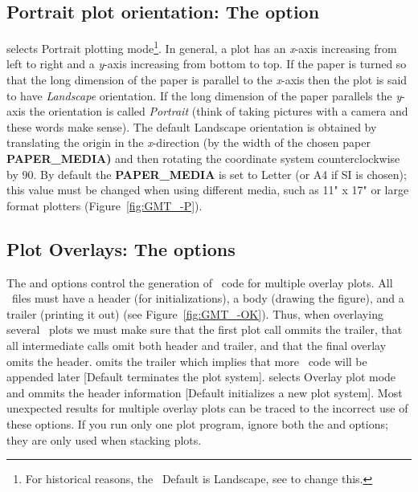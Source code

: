 \subsection{Portrait plot orientation: The  option} 


 selects Portrait plotting mode\footnote{For historical reasons, the \GMT\
Default is Landscape, see  to change this.}.  In general,
a plot has an \emph{x}-axis increasing from left to
right and a \emph{y}-axis increasing from bottom to top.  If the
paper is turned so that the long dimension of the paper is
parallel to the \emph{x}-axis then the plot is said to have
\emph{Landscape} orientation.  If the long dimension of
the paper parallels the \emph{y}-axis the orientation is called
\emph{Portrait} (think of taking pictures with a camera
and these words make sense).  The
default Landscape orientation is obtained by translating the origin in the
\emph{x}-direction (by the width of the chosen paper \textbf{PAPER\_MEDIA)} and then rotating the
coordinate system counterclockwise by 90\DS.  By default the \textbf{PAPER\_MEDIA} is
set to Letter (or A4 if SI is chosen); this value must be changed
when using different media, such as 11" x 17" or large format plotters
(Figure~\ref{fig:GMT_-P}).


\subsection{Plot Overlays: The   options}


The  and  options control the generation of \PS\ code for multiple
overlay plots.  All \PS\ files must have a header (for initializations),
a body (drawing the figure), and a trailer (printing it out) (see
Figure~\ref{fig:GMT_-OK}).  Thus,
when overlaying several \GMT\ plots we must make sure that the first plot
call ommits the trailer, that all intermediate calls omit both header and
trailer, and that the final overlay omits the header.
 omits the trailer which implies that more \PS\ code will be appended
later [Default terminates the plot system].  \Opt{O} selects Overlay plot
mode and ommits the header information [Default initializes a new plot system].
Most unexpected results for multiple overlay plots can be traced to the
incorrect use of these options.  If you run only one plot
program, ignore both the  and  options; they are
only used when stacking plots. 

